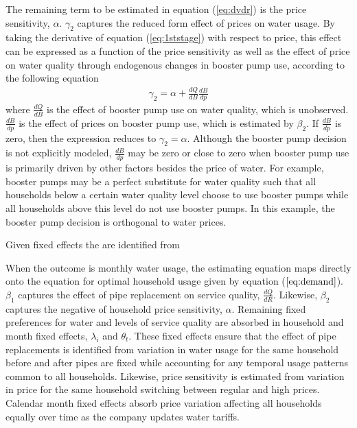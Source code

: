\documentclass[12pt,table]{article}
\begin{document}
The remaining term to be estimated in equation (\ref{eq:dvdr}) is the price sensitivity, $\alpha$.  $\gamma_2$ captures the reduced form effect of prices on water usage.  By taking the derivative of equation (\ref{eq:1ststage}) with respect to price, this effect can be expressed as a function of the price sensitivity as well as the effect of price on water quality through endogenous changes in booster pump use, according to the following equation
\begin{align*}
  \gamma_2 = \alpha +  \frac{dQ}{dB} \frac{dB}{dp}
\end{align*}
where $\frac{dQ}{dB}$ is the effect of booster pump use on water quality, which is unobserved.  $\frac{dB}{dp}$ is the effect of prices on booster pump use, which is estimated by $\beta_2$.  If $\frac{dB}{dp}$ is zero, then the expression reduces to $\gamma_2=\alpha$.  Although the booster pump decision is not explicitly modeled, $\frac{dB}{dp}$ may be zero or close to zero when booster pump use is primarily driven by other factors besides the price of water.  For example, booster pumps may be a perfect substitute for water quality such that all households below a certain water quality level choose to use booster pumps while all households above this level do not use booster pumps.  In this example, the booster pump decision is orthogonal to water prices.  

Given fixed effects the are identified from 

When the outcome is monthly water usage, the estimating equation maps directly onto the equation for optimal household usage given by equation ($\ref{eq:demand}$).  $\beta_1$ captures the effect of pipe replacement on service quality, $\frac{dQ}{dR}$.  Likewise, $\beta_2$ captures the negative of household price sensitivity, $\alpha$.  Remaining fixed preferences for water and levels of service quality are absorbed in household and month fixed effects, $\lambda_i$ and $\theta_t$.  These fixed effects ensure that the effect of pipe replacements is identified from variation in water usage for the same household before and after pipes are fixed while accounting for any temporal usage patterns common to all households.  Likewise, price sensitivity is estimated from variation in price for the same household switching between regular and high prices.  Calendar month fixed effects absorb price variation affecting all households equally over time as the company updates water tariffs.  
\end{document}
